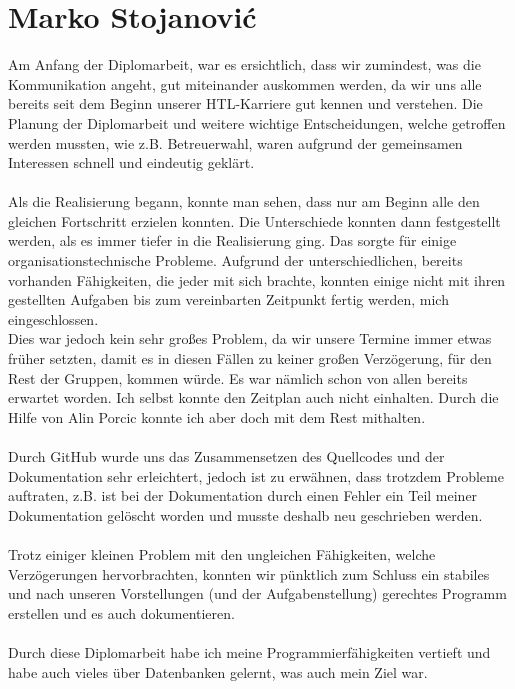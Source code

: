 \documentclass[12pt,a4paper]{report}
\begin{document}
\chapter{Marko Stojanovi\'{c}}
Am Anfang der Diplomarbeit, war es ersichtlich, dass wir zumindest, was die Kommunikation angeht, gut miteinander auskommen werden, da wir uns alle bereits seit dem Beginn unserer HTL-Karriere gut kennen und verstehen. Die Planung der Diplomarbeit und weitere wichtige Entscheidungen, welche getroffen werden mussten, wie z.B. Betreuerwahl, waren aufgrund der gemeinsamen Interessen schnell und eindeutig geklärt. \\\\
Als die Realisierung begann, konnte man sehen, dass nur am Beginn alle den gleichen Fortschritt erzielen konnten. Die Unterschiede konnten dann festgestellt werden, als es immer tiefer in die Realisierung ging. Das sorgte für einige organisationstechnische Probleme. Aufgrund der unterschiedlichen, bereits vorhanden Fähigkeiten, die jeder mit sich brachte, konnten einige nicht mit ihren gestellten Aufgaben bis zum vereinbarten Zeitpunkt fertig werden, mich eingeschlossen.\\
Dies war jedoch kein sehr großes Problem, da wir unsere Termine immer etwas früher setzten, damit es in diesen Fällen zu keiner großen Verzögerung, für den Rest der Gruppen, kommen würde. Es war nämlich schon von allen bereits erwartet worden. Ich selbst konnte den Zeitplan auch nicht einhalten. Durch die Hilfe von Alin Porcic konnte ich aber doch mit dem Rest mithalten.\\\\
Durch GitHub wurde uns das Zusammensetzen des Quellcodes und der Dokumentation sehr erleichtert, jedoch ist zu erwähnen, dass trotzdem Probleme auftraten, z.B. ist bei der Dokumentation durch einen Fehler ein Teil meiner Dokumentation gelöscht worden und musste deshalb neu geschrieben werden.\\\\
Trotz einiger kleinen Problem mit den ungleichen Fähigkeiten, welche Verzögerungen hervorbrachten, konnten wir pünktlich zum Schluss ein stabiles und nach unseren Vorstellungen (und der Aufgabenstellung) gerechtes Programm erstellen und es auch dokumentieren.\\\\
Durch diese Diplomarbeit habe ich meine Programmierfähigkeiten vertieft und habe auch vieles über Datenbanken gelernt, was auch mein Ziel war.
\end{document}
